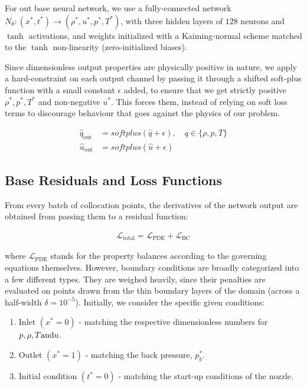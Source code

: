 For out base neural network, we use a fully-connected network $N_{\theta}: (x^*, t^*) \rightarrow (\rho^*, u^*, p^*, T^*)$, with three hidden layers of $128$ neurons and $\tanh$ activations, and weights initialized with a Kaiming-normal scheme matched to the $\tanh$ non-linearity (zero-initialized biases).

Since dimensionless output properties are physically positive in nature, we apply a hard-constraint on each output channel by passing it through a shifted soft-plus function with a small constant $\epsilon$ added, to ensure that we get strictly positive $\rho^*, p^*, T^*$ and non-negative $u^*$. This forces them, instead of relying on soft loss terms to discourage behaviour that goes against the physics of our problem.

\begin{align*}
    \hat{q}_\text{out} &= softplus(\hat{q} + \epsilon), \quad q \in \{ \rho, p, T \} \\
    \hat{u}_\text{out} &= softplus(\hat{u} + \epsilon)
\end{align*}

\subsection{Base Residuals and Loss Functions}

From every batch of collocation points, the derivatives of the network output are obtained from passing them to a residual function:

\begin{align*}
    \mathcal{L}_\text{total} = \mathcal{L}_\text{PDE} + \mathcal{L}_\text{BC}
\end{align*}

where $\mathcal{L}_\text{PDE}$ stands for the property balances according to the governing equations themselves. However, boundary conditions are broadly categorized into a few different types. They are weighed heavily, since their penalties are evaluated on points drawn from the thin boundary layers of the domain (across a half-width $\delta = 10^{-5}$). Initially, we consider the specific given conditions:

\begin{enumerate}
    \item Inlet $(x^* = 0)$ - matching the respective dimensionless numbers for $p, \rho, T \space \text{and} \space u$.
    \item Outlet $(x^* = 1)$ - matching the back pressure, $p^*_b$.
    \item Initial condition $(t^* = 0)$ - matching the start-up conditions of the nozzle.
\end{enumerate}

